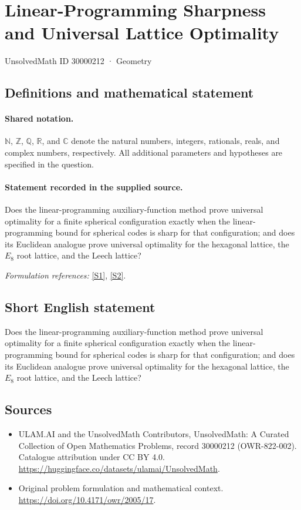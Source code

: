 \documentclass[11pt]{article}
\newcommand{\sref}[2]{\hyperlink{source:#1:#2}{[S#2]}}
\begin{document}
\setcounter{section}{30000211}
\section{Linear-Programming Sharpness and Universal Lattice Optimality}\label{30000212}
{\small UnsolvedMath ID 30000212 · Geometry}
\subsection{Definitions and mathematical statement}

\paragraph{Shared notation.}$\mathbb N$, $\mathbb Z$, $\mathbb Q$, $\mathbb R$, and $\mathbb C$ denote the natural numbers, integers, rationals, reals, and complex numbers, respectively. All additional parameters and hypotheses are specified in the question.


\paragraph{Statement recorded in the supplied source.}
Does the linear-programming auxiliary-function method prove universal optimality for a finite spherical configuration exactly when the linear-programming bound for spherical codes is sharp for that configuration; and does its Euclidean analogue prove universal optimality for the hexagonal lattice, the $E_8$ root lattice, and the Leech lattice?
\par\smallskip\textit{Formulation references:} \sref{30000212}{1}, \sref{30000212}{2}.
\subsection{Short English statement}
Does the linear-programming auxiliary-function method prove universal optimality for a finite spherical configuration exactly when the linear-programming bound for spherical codes is sharp for that configuration; and does its Euclidean analogue prove universal optimality for the hexagonal lattice, the $E_8$ root lattice, and the Leech lattice?
\subsection{Sources}
\begin{itemize}
\item[\hypertarget{source:30000212:1}{S1}] ULAM.AI and the UnsolvedMath Contributors, UnsolvedMath: A Curated Collection of Open Mathematics Problems, record 30000212 (OWR-822-002). Catalogue attribution under CC BY 4.0.
\url{https://huggingface.co/datasets/ulamai/UnsolvedMath}.
\item[\hypertarget{source:30000212:2}{S2}] Original problem formulation and mathematical context.
\url{https://doi.org/10.4171/owr/2005/17}.
\end{itemize}
\label{end:30000212}
\end{document}
